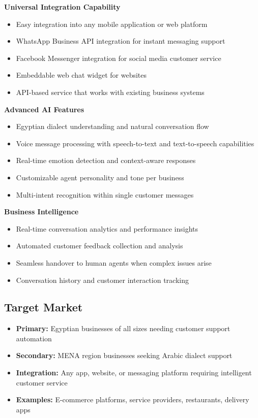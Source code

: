 \documentclass[12pt,a4paper]{article}
\begin{document}
\textbf{Universal Integration Capability}
\begin{itemize}
    \item Easy integration into any mobile application or web platform
    \item WhatsApp Business API integration for instant messaging support
    \item Facebook Messenger integration for social media customer service
    \item Embeddable web chat widget for websites
    \item API-based service that works with existing business systems
\end{itemize}

\textbf{Advanced AI Features}
\begin{itemize}
    \item Egyptian dialect understanding and natural conversation flow
    \item Voice message processing with speech-to-text and text-to-speech capabilities
    \item Real-time emotion detection and context-aware responses
    \item Customizable agent personality and tone per business
    \item Multi-intent recognition within single customer messages
\end{itemize}

\textbf{Business Intelligence}
\begin{itemize}
    \item Real-time conversation analytics and performance insights
    \item Automated customer feedback collection and analysis
    \item Seamless handover to human agents when complex issues arise
    \item Conversation history and customer interaction tracking
\end{itemize}

\subsection*{Target Market}
\begin{itemize}
    \item \textbf{Primary:} Egyptian businesses of all sizes needing customer support automation
    \item \textbf{Secondary:} MENA region businesses seeking Arabic dialect support
    \item \textbf{Integration:} Any app, website, or messaging platform requiring intelligent customer service
    \item \textbf{Examples:} E-commerce platforms, service providers, restaurants, delivery apps
\end{itemize}
\end{document}
